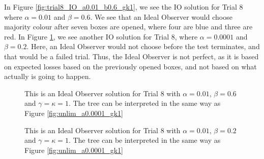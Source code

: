 In Figure \ref{fig:trial8_IO_a0.01_b0.6_gk1}, we see the IO solution for Trial 8 where $\alpha=0.01$ and $\beta=0.6$. We see that an Ideal Observer would choose majority colour after seven boxes are opened, where four are blue and three are red. In Figure \ref{fig:trial8_IO_a0.0001_b0.2_gk1}, we see another IO solution for Trial 8, where $\alpha=0.0001$ and $\beta=0.2$. Here, an Ideal Observer would not choose before the test terminates, and that would be a failed trial. Thus, the Ideal Observer is not perfect, as it is based on expected losses based on the previously opened boxes, and not based on what actually is going to happen.
\begin{figure}
    \centering
     \begin{minipage}[t]{0.45\textwidth}
        \centering
        \scalebox{0.7}{}
        \caption[IO solution, Trial 8. $\alpha=0.01$, $\beta=0.6$ and $\gamma=\kappa=1$.]{This is an Ideal Observer solution for Trial 8 with $\alpha=0.01$, $\beta=0.6$ and $\gamma=\kappa=1$. The tree can be interpreted in the same way as Figure \ref{fig:unlim_a0.0001_gk1}}
        \label{fig:trial8_IO_a0.01_b0.6_gk1}
     \end{minipage}\hfill
     \begin{minipage}[t]{0.45\textwidth}
        \centering
        \scalebox{0.7}{}
        \caption[IO solution, Trial 8. $\alpha=0.0001$, $\beta=0.2$ and $\gamma=\kappa=1$.]{This is an Ideal Observer solution for Trial 8 with $\alpha=0.01$, $\beta=0.2$ and $\gamma=\kappa=1$. The tree can be interpreted in the same way as Figure \ref{fig:unlim_a0.0001_gk1}}
        \label{fig:trial8_IO_a0.0001_b0.2_gk1}
     \end{minipage}
\end{figure}





